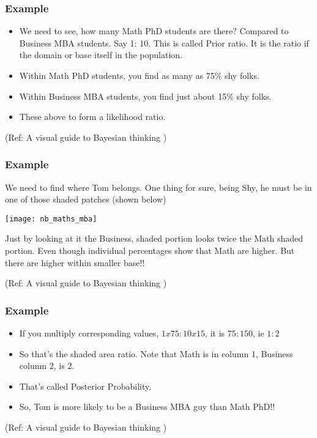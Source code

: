 \begin{frame}[fragile]\frametitle{Example}

\begin{itemize}
\item We need to see, how many Math PhD students are there? Compared to Business MBA students. Say 1: 10. This is called Prior ratio. It is the ratio if the domain or base itself in the population.
\item Within Math PhD students, you find as many as 75\% shy folks.
\item Within Business MBA students, you find just about 15\% shy folks.
\item These above to form a likelihood ratio.

\end{itemize}

{\tiny (Ref: A visual guide to Bayesian thinking )}
\end{frame}

\begin{frame}[fragile]\frametitle{Example}

We need to find where Tom belongs. One thing for sure, being Shy, he must be in one of those shaded patches (shown below)


\begin{center}
\texttt{[image: nb\_maths\_mba]}
\end{center}

Just by looking at it the Business, shaded portion looks twice the Math shaded portion. Even though individual percentages show that Math are higher. But there are higher within smaller base!!

{\tiny (Ref: A visual guide to Bayesian thinking )}
\end{frame}

\begin{frame}[fragile]\frametitle{Example}

\begin{itemize}
\item If you multiply corresponding values, $1x 75 : 10 x 15$, it is $75: 150$, ie $1:2$
\item So that’s the shaded area ratio. Note that Math is in column 1, Business column 2, is 2. 
\item That’s called Posterior Probability.
\item So, Tom is more likely to be a Business MBA guy than Math PhD!!
\end{itemize}

{\tiny (Ref: A visual guide to Bayesian thinking )}
\end{frame}

